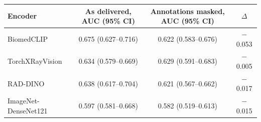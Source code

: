 \begin{tabular}{lccc}
\toprule
Encoder & As delivered, AUC (95\% CI) & Annotations masked, AUC (95\% CI) & $\Delta$ \\
\midrule
BiomedCLIP & 0.675 (0.627--0.716) & 0.622 (0.583--0.676) & $-$0.053 \\
TorchXRayVision & 0.634 (0.579--0.669) & 0.629 (0.591--0.683) & $-$0.005 \\
RAD-DINO & 0.638 (0.617--0.704) & 0.621 (0.567--0.662) & $-$0.017 \\
ImageNet-DenseNet121 & 0.597 (0.581--0.668) & 0.582 (0.519--0.613) & $-$0.015 \\
\bottomrule
\end{tabular}
